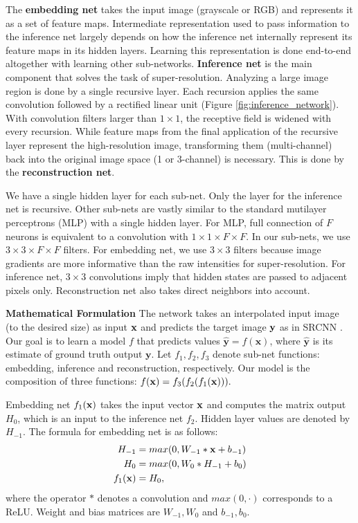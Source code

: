 \documentclass[10pt,twocolumn,letterpaper]{article}
\begin{document}
The \textbf{embedding net} takes the input image (grayscale or RGB) and represents it as a set of feature maps. Intermediate representation used to pass information to the inference net largely depends on how the inference net internally represent its feature maps in its hidden layers. Learning this representation is done end-to-end altogether with learning other sub-networks. \textbf{Inference net} is the main component that solves the task of super-resolution. Analyzing a large image region is done by a single recursive layer. Each recursion applies the same convolution followed by a rectified linear unit (Figure \ref{fig:inference_network}). With convolution filters larger than $1\times 1$,  the receptive field is widened with every recursion. While feature maps from the final application of the recursive layer represent the high-resolution image, transforming them (multi-channel) back into the original image space (1 or 3-channel) is necessary. This is done by the \textbf{reconstruction net}.  

We have a single hidden layer for each sub-net. Only the layer for the inference net is recursive. Other sub-nets are vastly similar to the standard mutilayer perceptrons (MLP) with a single hidden layer. For MLP, full connection of $F$ neurons is equivalent to a convolution with $1\times 1\times F \times F$. In our sub-nets, we use $3\times 3\times F \times F$ filters. For embedding net, we use $3\times 3$ filters because image gradients are more informative than the raw intensities for super-resolution. For inference net, $3\times 3$ convolutions imply that hidden states are passed to adjacent pixels only. Reconstruction net also takes direct neighbors into account.

\textbf{Mathematical Formulation} The network takes an interpolated input image (to the desired size) as input ${\bf x}$ and predicts the target image ${\bf y}$ as in SRCNN \cite{dong2014image}. Our goal is to learn a model $f$ that predicts values $\mathbf{\hat{y}}=f(\mathbf{x})$, where $\mathbf{\hat{y}}$ is its estimate of ground truth output $\mathbf{y}$. Let $f_1, f_2, f_3$ denote sub-net functions: embedding, inference and reconstruction, respectively. Our model is the composition of three functions: $f({\bf x}) = f_3(f_2 (f_1({\bf x}))).$
 
 Embedding net $f_1({\bf x})$ takes the input vector ${\bf x}$ and computes the matrix output $H_0$, which is an input to the inference net $f_2$. Hidden layer values are denoted by $H_{-1}$. The formula for embedding net is as follows:
  \begin{align}
        H_{-1} &= max(0, W_{-1}*{\bf x} + b_{-1})\\
        H_0 &= max(0, W_{0}*H_{-1} + b_0)\\
        f_1({\bf x}) &= H_0,
    \end{align}
where the operator $*$ denotes a convolution and $max(0,\cdot)$ corresponds to a ReLU. Weight and bias matrices are $W_{-1},W_0$ and $b_{-1},b_0$.
\end{document}
